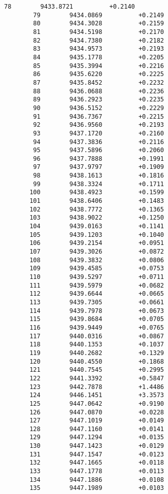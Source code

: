 \documentclass[11pt]{article}
\begin{document}
\begin{Verbatim}[commandchars=\\\{\}]
        78        9433.8721          +0.2140
        79        9434.0869          +0.2149
        80        9434.3028          +0.2159
        81        9434.5198          +0.2170
        82        9434.7380          +0.2182
        83        9434.9573          +0.2193
        84        9435.1778          +0.2205
        85        9435.3994          +0.2216
        86        9435.6220          +0.2225
        87        9435.8452          +0.2232
        88        9436.0688          +0.2236
        89        9436.2923          +0.2235
        90        9436.5152          +0.2229
        91        9436.7367          +0.2215
        92        9436.9560          +0.2193
        93        9437.1720          +0.2160
        94        9437.3836          +0.2116
        95        9437.5896          +0.2060
        96        9437.7888          +0.1991
        97        9437.9797          +0.1909
        98        9438.1613          +0.1816
        99        9438.3324          +0.1711
       100        9438.4923          +0.1599
       101        9438.6406          +0.1483
       102        9438.7772          +0.1365
       103        9438.9022          +0.1250
       104        9439.0163          +0.1141
       105        9439.1203          +0.1040
       106        9439.2154          +0.0951
       107        9439.3026          +0.0872
       108        9439.3832          +0.0806
       109        9439.4585          +0.0753
       110        9439.5297          +0.0711
       111        9439.5979          +0.0682
       112        9439.6644          +0.0665
       113        9439.7305          +0.0661
       114        9439.7978          +0.0673
       115        9439.8684          +0.0705
       116        9439.9449          +0.0765
       117        9440.0316          +0.0867
       118        9440.1353          +0.1037
       119        9440.2682          +0.1329
       120        9440.4550          +0.1868
       121        9440.7545          +0.2995
       122        9441.3392          +0.5847
       123        9442.7878          +1.4486
       124        9446.1451          +3.3573
       125        9447.0642          +0.9190
       126        9447.0870          +0.0228
       127        9447.1019          +0.0149
       128        9447.1160          +0.0141
       129        9447.1294          +0.0135
       130        9447.1423          +0.0129
       131        9447.1547          +0.0123
       132        9447.1665          +0.0118
       133        9447.1778          +0.0113
       134        9447.1886          +0.0108
       135        9447.1989          +0.0103

\end{Verbatim}
\end{document}
